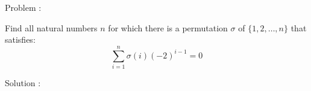 Problem : 

Find all natural numbers $n$ for which there is a permutation $\sigma$ of $\{1,2,\ldots, n\}$ that satisfies:
\[ \sum_{i=1}^n \sigma(i)(-2)^{i-1}=0 \]

Solution :



